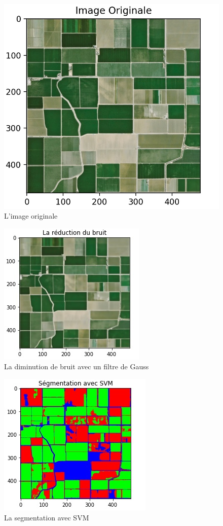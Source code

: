 \documentclass[12pt, openany]{report}
\begin{document}
\begin{figure}[H]
\centering
\includegraphics[scale=0.3]{imgor.jpg}
\caption{L'image originale}
\end{figure}

\begin{figure}[H]
\centering
\includegraphics[scale=1]{blur.jpg}
\caption{La diminution de bruit avec un filtre de Gauss}
\end{figure}

\begin{figure}[H]
\centering
\includegraphics[scale=1]{svm.jpg}
\caption{La segmentation avec SVM}
\end{figure}
\end{document}

